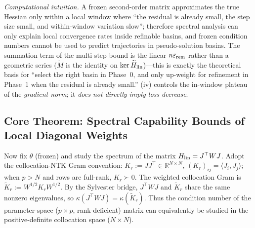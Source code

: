 \documentclass[11pt]{article}
\newcommand{\R}{\mathbb R}
\newcommand{\W}{W}
\newcommand{\wt}[1]{\widetilde{#1}}
\numberwithin{equation}{section}
\begin{document}
\noindent\emph{Computational intuition.} A frozen second-order matrix approximates the true Hessian only within a local window where ``the residual is already small, the step size small, and within-window variation slow''; therefore spectral analysis can only explain local convergence rates inside refinable basins, and frozen condition numbers cannot be used to predict trajectories in pseudo-solution basins. The summation term of the multi-step bound is the linear $n\bar\varepsilon_{\rm rem}$ rather than a geometric series ($\wt M$ is the identity on $\ker\wt H_{\rm lin}$)---this is exactly the theoretical basis for ``select the right basin in Phase~0, and only up-weight for refinement in Phase~1 when the residual is already small.'' (iv) controls the in-window plateau of the \emph{gradient norm}; it \emph{does not directly imply loss decrease}.

\subsection{Core Theorem: Spectral Capability Bounds of Local Diagonal Weights}\label{sec:R-theory}

Now fix $\theta$ (frozen) and study the spectrum of the matrix $H_{\rm lin}=J^\top\W J$. Adopt the collocation-NTK Gram convention: $K_r:=JJ^\top\in\R^{N\times N}$, $(K_r)_{ij}=\langle J_i,J_j\rangle$; when $p>N$ and rows are full-rank, $K_r\succ0$. The weighted collocation Gram is $\widetilde K_r:=\W^{1/2}K_r\W^{1/2}$. By the Sylvester bridge, $J^\top\W J$ and $\widetilde K_r$ share the same nonzero eigenvalues, so $\kappa(J^\top\W J)=\kappa(\widetilde K_r)$. Thus the condition number of the parameter-space ($p\times p$, rank-deficient) matrix can equivalently be studied in the positive-definite collocation space ($N\times N$).
\end{document}
